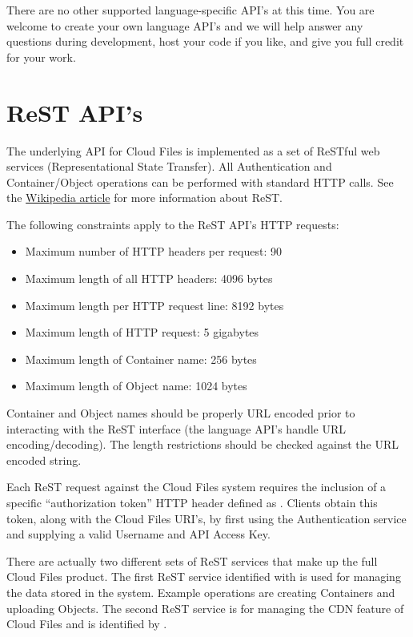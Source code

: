 \documentclass[letterpaper,10pt,english]{manual}
\begin{document}
There are no other supported language-specific API's at this time.  You
are welcome to create your own language API's and we will help answer any
questions during development, host your code if you like, and give you
full credit for your work.


\chapter{ReST API's}

The underlying API for Cloud Files is implemented as a set of ReSTful
web services (Representational State Transfer). All Authentication and
Container/Object operations can be performed with standard HTTP calls.
See the \href{http://en.wikipedia.org/wiki/Representational\_State\_Transfer}{Wikipedia article} for more information about ReST.

The following constraints apply to the ReST API's HTTP requests:
\begin{itemize}
\item {} 
Maximum number of HTTP headers per request: 90

\item {} 
Maximum length of all HTTP headers: 4096 bytes

\item {} 
Maximum length per HTTP request line: 8192 bytes

\item {} 
Maximum length of HTTP request: 5 gigabytes

\item {} 
Maximum length of Container name: 256 bytes

\item {} 
Maximum length of Object name: 1024 bytes

\end{itemize}

Container and Object names should be properly URL encoded prior
to interacting with the ReST interface (the language API's handle
URL encoding/decoding).  The length restrictions should be checked
against the URL encoded string.

Each ReST request against the Cloud Files system requires the inclusion of
a specific “authorization token” HTTP header defined as .
Clients obtain this token, along with the Cloud Files URI's, by first
using the Authentication service and supplying a valid Username and API
Access Key.

There are actually two different sets of ReST services that make up the
full Cloud Files product.  The first ReST service identified with
 is used for managing the data stored in the system.
Example operations are creating Containers and uploading Objects.  The
second ReST service is for managing the CDN feature of Cloud Files and is
identified by .
\end{document}
